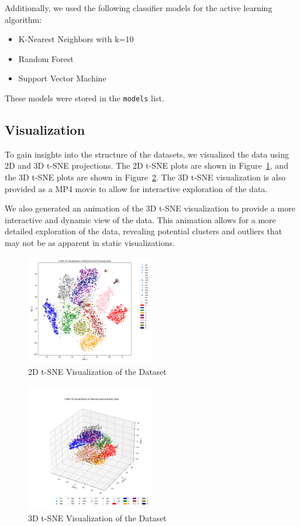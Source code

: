 Additionally, we used the following classifier models for the active learning algorithm:
\begin{itemize}
    \item K-Nearest Neighbors with k=10
    \item Random Forest
    \item Support Vector Machine
\end{itemize}
These models were stored in the \texttt{models} list.

\subsection{Visualization}
To gain insights into the structure of the datasets, we visualized the data using 2D and 3D t-SNE projections. The 2D t-SNE plots are shown in Figure~\ref{fig:tsne_2d}, and the 3D t-SNE plots are shown in Figure~\ref{fig:tsne_3d}. The 3D t-SNE visualization is also provided as a MP4 movie to allow for interactive exploration of the data.\par
We also generated an animation of the 3D t-SNE visualization to provide a more interactive and dynamic view of the data. This animation allows for a more detailed exploration of the data, revealing potential clusters and outliers that may not be as apparent in static visualizations.
\begin{figure}[htbp]
\centering
\includegraphics[width=0.5\textwidth]{resources/images/tsne_2d.png}
\caption{2D t-SNE Visualization of the Dataset}
\label{fig:tsne_2d}
\end{figure}

\begin{figure}[htbp]
\centering
\includegraphics[width=0.5\textwidth]{resources/images/tsne_3d.png}
\caption{3D t-SNE Visualization of the Dataset}
\label{fig:tsne_3d}
\end{figure}